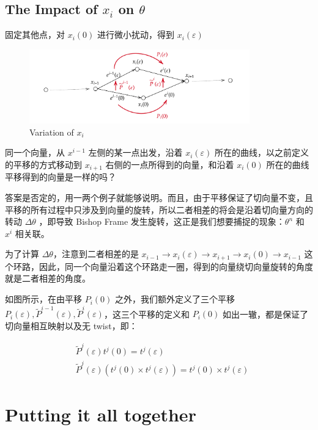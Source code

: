 \documentclass{notes}
\begin{document}
\subsection{The Impact of $x_i$ on $\theta$}

固定其他点，对 $x_i(0)$ 进行微小扰动，得到 $x_i(\varepsilon)$

\begin{figure}[H]
	\centering
	\includegraphics[width=0.85\textwidth]{img/holonomy.png}
	\caption{Variation of $x_i$}
\end{figure}

同一个向量，从 $x^{i - 1}$ 左侧的某一点出发，沿着 $x_i(\varepsilon)$ 所在的曲线，以之前定义的平移的方式移动到 $x_{i + 1}$ 右侧的一点所得到的向量，和沿着 $x_{i}(0)$ 所在的曲线平移得到的向量是一样的吗？

答案是否定的，用一两个例子就能够说明。而且，由于平移保证了切向量不变，且平移的所有过程中只涉及到向量的旋转，所以二者相差的将会是沿着切向量方向的转动 $\Delta \theta$ ，即导致 Bishop Frame 发生旋转，这正是我们想要捕捉的现象：$\theta^n$ 和 $x^i$ 相关联。

为了计算 $\Delta \theta$，注意到二者相差的是 $x_{i - 1} \rightarrow x_{i}(\varepsilon) \rightarrow x_{i + 1} \rightarrow x_i(0) \rightarrow x_{i - 1}$ 这个环路，因此，同一个向量沿着这个环路走一圈，得到的向量绕切向量旋转的角度就是二者相差的角度。

如图所示，在由平移 $P_i(0)$ 之外，我们额外定义了三个平移 $P_i(\varepsilon), \tilde{P}^{i - 1}(\varepsilon), \tilde{P}^{i}(\varepsilon)$，这三个平移的定义和 $P_i(0)$ 如出一辙，都是保证了切向量相互映射以及无 twist，即：

\begin{equation}
	\begin{aligned}
		&\tilde{P}^{j}(\varepsilon)t^j(0) = t^j(\varepsilon) \\
		&\tilde{P}^j(\varepsilon)(t^j(0) \times t^j(\varepsilon)) = t^j(0) \times t^j(\varepsilon)
	\end{aligned}
\end{equation}

\section{Putting it all together}
\end{document}
